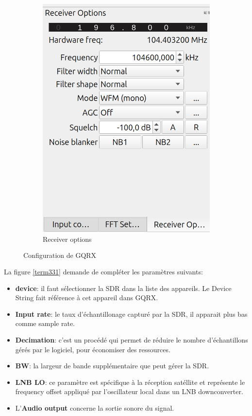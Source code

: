 \begin{figure}[h]
\begin{subfigure}{0.35\textwidth}
  \includegraphics[width=\textwidth]{images/gqrx3.png}
  \caption{Receiver options}
  \label{term341}
\end{subfigure}
\caption{Configuration de GQRX}
\label{term37}
\end{figure}

La figure \ref{term331} demande de compléter les paramètres suivants:

\vspace{0.1cm}

\begin{itemize}
\item \textbf{device}: il faut sélectionner la SDR dans la liste des appareils. Le Device String fait référence à cet appareil dans GQRX.
\item \textbf{Input rate}: le taux d'échantillonage capturé par la \ac{SDR}, il apparait plus bas comme sample rate.
\item \textbf{Decimation}: c'est un procédé qui permet de réduire le nombre d'échan\-tillons gérés par le logiciel, pour économiser des ressources.
\item \textbf{\ac{BW}}: la largeur de bande supplémentaire que peut gérer la SDR.
\item \textbf{\ac{LNB LO}}: ce paramètre est spécifique à la réception satéllite et représente le frequency offset appliqué par l'oscillateur local dans un LNB downconverter.
\item L'\textbf{Audio output} concerne la sortie sonore du signal.
\end{itemize}

